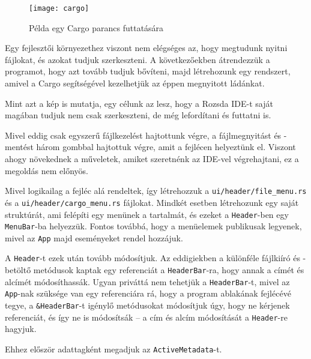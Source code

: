 
\begin{figure}[h!]
    \centering
    \texttt{[image: cargo]}
	\caption{Példa egy Cargo parancs futtatására}
	\label{fig:cargo_window}
\end{figure}

Egy fejlesztői környezethez viszont nem elégséges az, hogy megtudunk nyitni fájlokat,
és azokat tudjuk szerkeszteni.
A következőekben átrendezzük a programot, hogy azt tovább tudjuk bővíteni,
majd létrehozunk egy rendszert, amivel a Cargo segítségével kezelhetjük az éppen
megnyitott ládánkat.

Mint azt a kép is mutatja, egy célunk az lesz, hogy a Rozsda IDE-t saját magában
tudjuk nem csak szerkeszteni, de még lefordítani és futtatni is.


Mivel eddig csak egyszerű fájlkezelést hajtottunk végre, a fájlmegnyitást és -mentést
három gombbal hajtottuk végre, amit a fejlécen helyeztünk el.
Viszont ahogy növekednek a műveletek, amiket szeretnénk az IDE-vel végrehajtani,
ez a megoldás nem előnyös.

Mivel logikailag a fejléc alá rendeltek, így létrehozzuk a 
\texttt{ui/header/file\_menu.rs} és a \texttt{ui/header/cargo\_menu.rs} fájlokat.
Mindkét esetben létrehozunk egy saját struktúrát, ami felépíti egy menünek a tartalmát,
és ezeket a \texttt{Header}-ben egy \texttt{MenuBar}-ba helyezzük.
Fontos továbbá, hogy a menüelemek publikusak legyenek, mivel az \texttt{App} majd
eseményeket rendel hozzájuk.



A \texttt{Header}-t ezek után tovább módosítjuk.
Az eddigiekben a különféle fájlkiíró és -betöltő metódusok kaptak egy referenciát a
\texttt{HeaderBar}-ra, hogy annak a címét és alcímét módosíthassák.
Ugyan priváttá nem tehetjük a \texttt{HeaderBar}-t, mivel az \texttt{App}-nak szüksége
van egy referenciára rá, hogy a program ablakának fejlécévé tegye,
a \texttt{\&HeaderBar}-t igénylő metódusokat módosítjuk úgy, hogy ne kérjenek referenciát,
és így ne is módosítsák -- a cím és alcím módosítását a \texttt{Header}-re hagyjuk.

Ehhez először adattagként megadjuk az \texttt{ActiveMetadata}-t.



